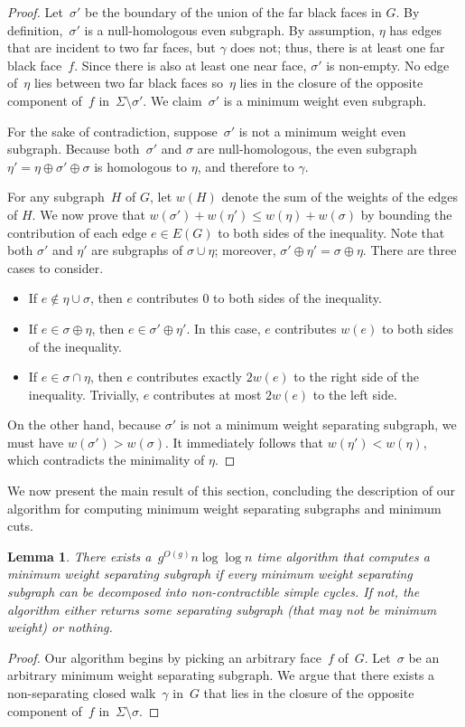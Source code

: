 \documentclass[11pt,twoside]{article}
\newtheorem{lemma}[theorem]{Lemma}
\begin{document}
{\begin{proof}
Let~$\sigma'$ be the boundary of the union of the far black faces in $G$.
By definition,~$\sigma'$ is a null-homologous even subgraph.  By assumption, $\eta$ has edges that are incident to two far faces, but $\gamma$ does not; thus, there is at least one far black face~$f$.  Since there is also at least one near face, $\sigma'$ is non-empty. 
No edge of~$\eta$ lies between two far black faces so~$\eta$ lies in the closure of the opposite component of~$f$ in~$\Sigma \setminus \sigma'$. We claim~$\sigma'$ is a minimum weight even subgraph.

For the sake of contradiction, suppose~$\sigma'$ is not a minimum weight even subgraph.
Because both~$\sigma'$ and $\sigma$ are null-homologous, the even subgraph $\eta' = \eta \oplus \sigma' \oplus \sigma$ is homologous to $\eta$, and therefore to $\gamma$.

For any subgraph~$H$ of $G$, let $w(H)$ denote the sum of the weights of the edges of $H$.  We now prove that $w(\sigma') + w(\eta') \leq w(\eta) + w(\sigma)$ by bounding the contribution of each edge $e \in E(G)$ to both sides of the inequality.  Note that both $\sigma'$ and $\eta'$ are subgraphs of $\sigma\cup \eta$; moreover, $\sigma' \oplus \eta' = \sigma \oplus \eta$.  There are three cases to consider.
\begin{itemize}
\item
If $e \not\in \eta \cup \sigma$, then $e$ contributes $0$ to both sides of the inequality.
\item
If $e \in \sigma \oplus \eta$, then $e \in \sigma' \oplus \eta'$.  In this case, $e$ contributes $w(e)$ to both sides of the inequality.
\item
If $e \in \sigma \cap \eta$, then $e$ contributes exactly $2w(e)$ to the right side of the inequality.  Trivially, $e$ contributes at most $2w(e)$ to the left side.
\end{itemize}

On the other hand, because $\sigma'$ is not a minimum weight separating subgraph, we must have $w(\sigma') > w(\sigma)$. 
It immediately follows that $w(\eta') < w(\eta)$, which contradicts the minimality of $\eta$.
\end{proof}

We now present the main result of this section, concluding the description of our algorithm for computing minimum weight separating subgraphs and minimum cuts.
\begin{lemma}
  \label{lem:global_split-alg}
  There exists a~$g^{O(g)} n \log \log n$ time algorithm that computes a minimum weight separating subgraph if every minimum weight separating subgraph can be decomposed into non-contractible simple cycles. If not, the algorithm either returns some separating subgraph (that may not be minimum weight) or nothing.
\end{lemma}
\begin{proof}
Our algorithm begins by picking an arbitrary face~$f$ of~$G$. Let~$\sigma$ be an arbitrary minimum weight separating subgraph.
We argue that there exists a non-separating closed walk~$\gamma$ in~$G$ that lies in the closure of the opposite component of~$f$ in~$\Sigma \setminus \sigma$.


\end{proof}}
\end{document}
